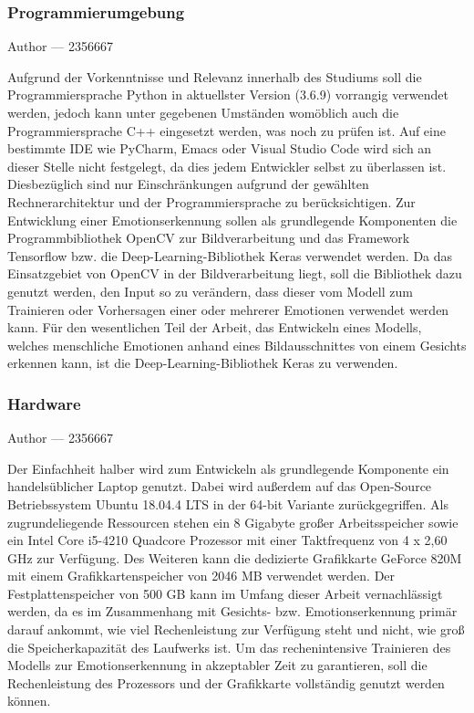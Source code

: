 \documentclass[12pt, a4paper]{report}
\makeatletter
\newcommand{\sectionauthor}[1]{%
  {\parindent0pt\vspace*{-5pt}%
  \large{Author --- }
  \linespread{1.1}\large\scshape#1%
  \par\nobreak\vspace*{35pt} }
  \@afterheading%
}
\makeatother
\begin{document}
\subsubsection{Programmierumgebung}
\sectionauthor{2356667}
Aufgrund der Vorkenntnisse und Relevanz innerhalb des Studiums soll die Programmiersprache Python in aktuellster Version (3.6.9) vorrangig verwendet werden, jedoch kann unter gegebenen Umständen womöblich auch die Programmiersprache C++ eingesetzt werden, was noch zu prüfen ist. Auf eine bestimmte IDE wie PyCharm, Emacs oder Visual Studio Code wird sich an dieser Stelle nicht festgelegt, da dies jedem Entwickler selbst zu überlassen ist. Diesbezüglich sind nur Einschränkungen aufgrund der gewählten Rechnerarchitektur und der Programmiersprache zu berücksichtigen.\newline
Zur Entwicklung einer Emotionserkennung sollen als grundlegende Komponenten die Programmbibliothek OpenCV zur Bildverarbeitung und das Framework Tensorflow bzw. die Deep-Learning-Bibliothek Keras verwendet werden. Da das Einsatzgebiet von OpenCV in der Bildverarbeitung liegt, soll die Bibliothek dazu genutzt werden, den Input so zu verändern, dass dieser vom Modell zum Trainieren oder Vorhersagen einer oder mehrerer Emotionen verwendet werden kann. Für den wesentlichen Teil der Arbeit, das Entwickeln eines Modells, welches menschliche Emotionen anhand eines Bildausschnittes von einem Gesichts erkennen kann, ist die Deep-Learning-Bibliothek Keras zu verwenden.

\subsubsection{Hardware}
\sectionauthor{2356667}
Der Einfachheit halber wird zum Entwickeln als grundlegende Komponente ein handelsüblicher Laptop genutzt. Dabei wird außerdem auf das Open-Source Betriebssystem Ubuntu 18.04.4 LTS in der 64-bit Variante zurückgegriffen. Als zugrundeliegende Ressourcen stehen ein 8 Gigabyte großer Arbeitsspeicher sowie ein Intel Core i5-4210 Quadcore Prozessor mit einer Taktfrequenz von 4 x 2,60 GHz zur Verfügung. Des Weiteren kann die dedizierte Grafikkarte GeForce 820M mit einem Grafikkartenspeicher von 2046 MB verwendet werden. Der Festplattenspeicher von 500 GB kann im Umfang dieser Arbeit vernachlässigt werden, da es im Zusammenhang mit Gesichts- bzw. Emotionserkennung primär darauf ankommt, wie viel Rechenleistung zur Verfügung steht und nicht, wie groß die Speicherkapazität des Laufwerks ist. Um das rechenintensive Trainieren des Modells zur Emotionserkennung in akzeptabler Zeit zu garantieren, soll die Rechenleistung des Prozessors und der Grafikkarte vollständig genutzt werden können.
\end{document}
